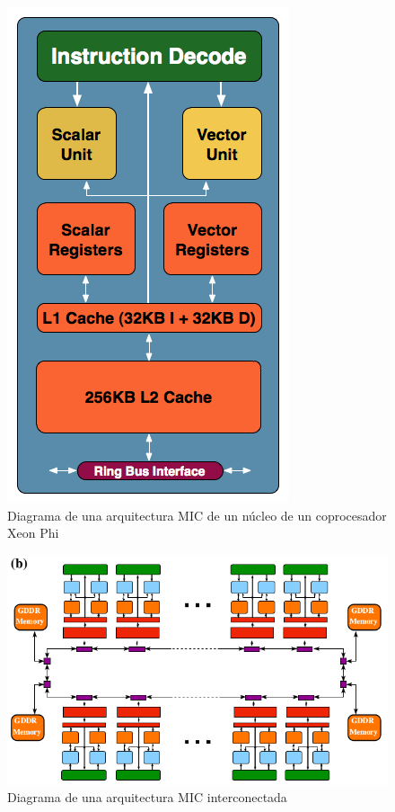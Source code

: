 \begin{figure}
	\begin{center}
		\includegraphics[scale=0.5]{fig/core.png}
		\caption{\label{estructuraxeon}Diagrama de una arquitectura MIC de un núcleo de un coprocesador Xeon Phi}
	\end{center}
\end{figure}

\begin{figure}
	\centering
	\includegraphics[scale=0.5]{fig/b.png}
	\caption{\label{estructuraxeon2}Diagrama de una arquitectura MIC interconectada}
\end{figure}

